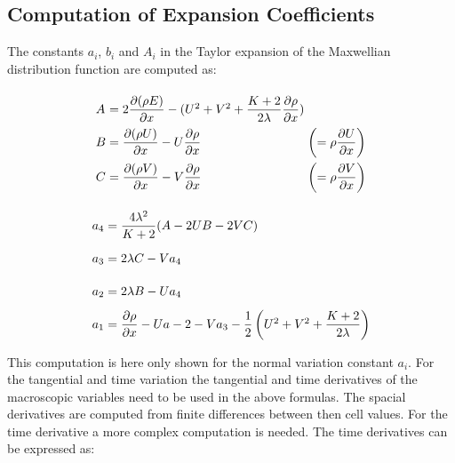 \documentclass[
	pdftex,             %
	12pt,				%
	a4paper,		   	%
	english,				%
	oneside,			%
]{article}
\begin{document}
\clearpage

\subsection*{Computation of Expansion Coefficients}

The constants $a_i$, $b_i$ and $A_i$ in the Taylor expansion of the Maxwellian distribution function are computed as:

\begin{eqnarray}
\begin{split}
\arraycolsep=1.4pt\def\arraystretch{2.2}
\begin{array}{lcll}
A &=& 2 \dfrac{\partial (\rho E)}{\partial x} 
  - ( U^2 + V^2 + \dfrac{K+2}{2\lambda} \dfrac{\partial\rho}{\partial x} ) &
\\
B &=& \dfrac{\partial (\rho U)}{\partial x} - U\dfrac{\partial \rho}{\partial x}
	&\left( = \rho \dfrac{\partial U}{\partial x} \right)
\\
C &=& \dfrac{\partial (\rho V)}{\partial x} - V\dfrac{\partial \rho}{\partial x}
	&\left( = \rho \dfrac{\partial V}{\partial x} \right)
\end{array}
\end{split}
\end{eqnarray}

\begin{eqnarray}
\begin{split}
\arraycolsep=1.4pt\def\arraystretch{2.2}
\begin{array}{lcl}
a_4 &=& \dfrac{4 \lambda^2}{K+2} ( A - 2 U B - 2 V C )
\\
a_3 &=& 2 \lambda C - V a_4
\\
a_2 &=& 2 \lambda B - U a_4
\\
a_1 &=& \dfrac{\partial \rho}{\partial x} - U a-2 - V a_3 - \dfrac{1}{2} \left( U^2 + V^2 + \dfrac{K+2}{2\lambda} \right)
\end{array}
\end{split}
\end{eqnarray}

This computation is here only shown for the normal variation constant $a_i$. For the tangential and time variation the tangential and time derivatives of the macroscopic variables need to be used in the above formulas. The spacial derivatives are computed from finite differences between then cell values. For the time derivative a more complex computation is needed. The time derivatives can be expressed as:
\end{document}
